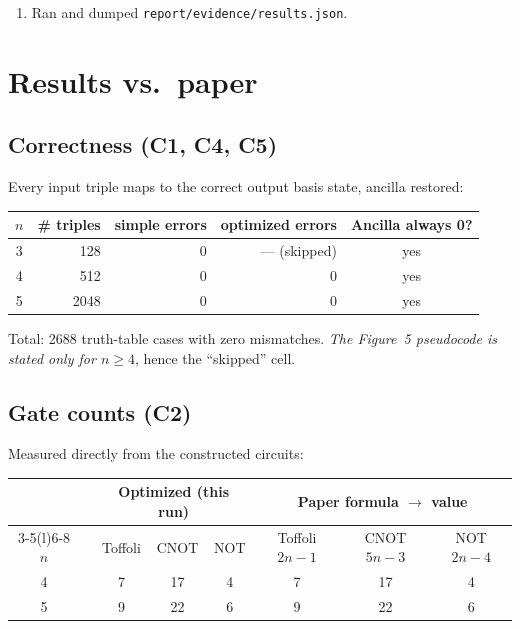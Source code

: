 \documentclass[11pt]{article}
\begin{document}
\begin{enumerate}
\item Ran and dumped \texttt{report/evidence/results.json}.
\end{enumerate}

\section{Results vs.\ paper}
\label{sec:results}

\subsection{Correctness (C1, C4, C5)}
Every input triple maps to the correct output basis state, ancilla restored:

\begin{center}
\begin{tabular}{crrrc}
\toprule
$n$ & \# triples & simple errors & optimized errors & Ancilla always 0? \\ \midrule
3 &  128 & 0 & --- (skipped) & yes \\
4 &  512 & 0 & 0             & yes \\
5 & 2048 & 0 & 0             & yes \\
\bottomrule
\end{tabular}
\end{center}

Total: 2688 truth-table cases with zero mismatches. \emph{The Figure~5
pseudocode is stated only for $n \ge 4$}, hence the ``skipped'' cell.

\subsection{Gate counts (C2)}
Measured directly from the constructed circuits:

\begin{center}
\begin{tabular}{crcccccc}
\toprule
      & & \multicolumn{3}{c}{Optimized (this run)} & \multicolumn{3}{c}{Paper formula $\to$ value} \\
\cmidrule(lr){3-5}\cmidrule(l){6-8}
$n$   & & Toffoli & CNOT & NOT & Toffoli $2n{-}1$ & CNOT $5n{-}3$ & NOT $2n{-}4$ \\ \midrule
4 & & 7 & 17 & 4 & 7 & 17 & 4 \\
5 & & 9 & 22 & 6 & 9 & 22 & 6 \\
\bottomrule
\end{tabular}
\end{center}
\end{document}
